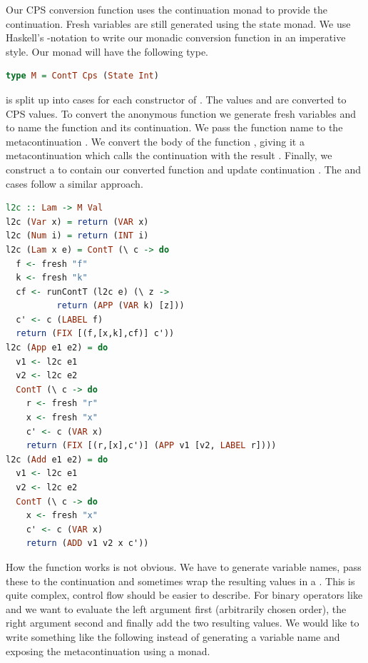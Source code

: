 {Our CPS conversion function uses the continuation monad to provide the continuation. Fresh variables are still generated using the state monad. We use Haskell's -notation to write our monadic conversion function in an imperative style. Our monad  will have the following type.

\begin{lstlisting}[language=Haskell]
type M = ContT Cps (State Int)
\end{lstlisting}

 is split up into cases for each constructor of . The values  and  are converted to CPS values. To convert the anonymous function  we generate fresh variables  and  to name the function and its continuation. We pass the function name to the metacontinuation . We convert the body of the function , giving it a metacontinuation which calls the continuation with the result . Finally, we construct a  to contain our converted function and update continuation . The  and  cases follow a similar approach.

\begin{lstlisting}[language=Haskell]
l2c :: Lam -> M Val
l2c (Var x) = return (VAR x)
l2c (Num i) = return (INT i)
l2c (Lam x e) = ContT (\ c -> do
  f <- fresh "f"
  k <- fresh "k"
  cf <- runContT (l2c e) (\ z ->
          return (APP (VAR k) [z]))
  c' <- c (LABEL f)
  return (FIX [(f,[x,k],cf)] c'))
l2c (App e1 e2) = do
  v1 <- l2c e1
  v2 <- l2c e2
  ContT (\ c -> do
    r <- fresh "r"
    x <- fresh "x"
    c' <- c (VAR x)
    return (FIX [(r,[x],c')] (APP v1 [v2, LABEL r])))
l2c (Add e1 e2) = do
  v1 <- l2c e1
  v2 <- l2c e2
  ContT (\ c -> do
    x <- fresh "x"
    c' <- c (VAR x)
    return (ADD v1 v2 x c'))
\end{lstlisting}

How the  function works is not obvious. We have to generate variable names, pass these to the continuation and sometimes wrap the resulting values in a . This is quite complex, control flow should be easier to describe. For binary operators like  and  we want to evaluate the left argument first (arbitrarily chosen order), the right argument second and finally add the two resulting values. We would like to write something like the following instead of generating a variable name and exposing the metacontinuation using a monad.

}
